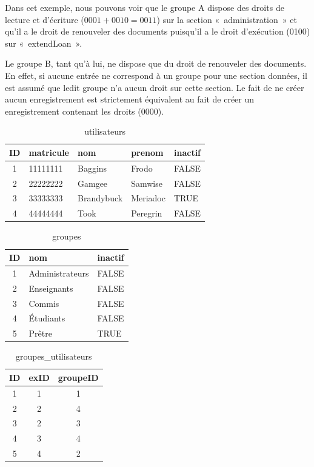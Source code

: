 \documentclass[letter, 10pt]{report}
\begin{document}
Dans cet exemple, nous pouvons voir que le groupe A dispose des droits de lecture et d'écriture ($ 0001 + 0010 = 0011 $) sur la section «~administration~» et qu'il a le droit de renouveler des documents puisqu'il a le droit d'exécution (0100) sur «~extendLoan~».

Le groupe B, tant qu'à lui, ne dispose que du droit de renouveler des documents. En effet, si aucune entrée ne correspond à un groupe pour une section données, il est assumé que ledit groupe n'a aucun droit sur cette section. Le fait de ne créer aucun enregistrement est strictement équivalent au fait de créer un enregistrement contenant les droits (0000).

\begin{table}[h!]
	\caption{utilisateurs}
	\begin{center}
		\begin{tabular}{|c|l|l|l|l|}
			\hline
			ID & matricule & nom         & prenom   & inactif \\
			\hline
			1  & 11111111  & Baggins     & Frodo    & FALSE \\
			2  & 22222222  & Gamgee      & Samwise  & FALSE \\
			3  & 33333333  & Brandybuck  & Meriadoc & TRUE \\
			4  & 44444444  & Took        & Peregrin & FALSE \\
			\hline
		\end{tabular}
	\end{center}
\end{table}

\begin{table}[h!]
	\caption{groupes}
	\begin{center}
		\begin{tabular}{|c|l|l|}
			\hline
			ID & nom               & inactif \\
			\hline
			1  & Administrateurs   & FALSE \\
			2  & Enseignants       & FALSE \\
			3  & Commis            & FALSE \\
			4  & Étudiants         & FALSE \\
			5  & Prêtre            & TRUE \\
			\hline
		\end{tabular}
	\end{center}
\end{table}

\begin{table}[h!]
	\caption{groupes\_utilisateurs}
	\begin{center}
		\begin{tabular}{|c|c|c|}
			\hline
			ID & exID & groupeID \\
			\hline
			1  & 1    & 1 \\
			2  & 2    & 4 \\
			3  & 2    & 3 \\
			4  & 3    & 4 \\
			5  & 4    & 2 \\
			\hline
		\end{tabular}
	\end{center}
\end{table}
\end{document}
